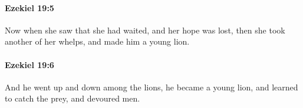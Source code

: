 		\paragraph{Ezekiel 19:5} %
			\label{EZEKIEL-19-5}

			Now when she saw that she had waited, and her hope was lost, then she took another of her whelps, and made him a young lion.


		\paragraph{Ezekiel 19:6} %
			\label{EZEKIEL-19-6}

			And he went up and down among the lions, he became a young lion, and learned to catch the prey, and devoured men.


